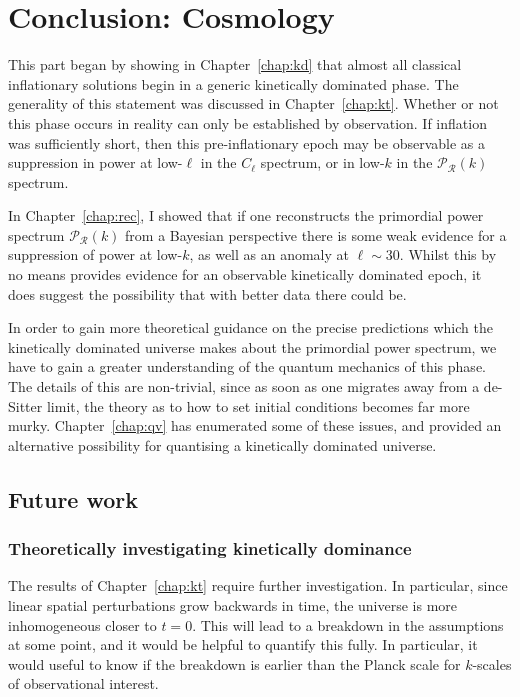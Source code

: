 \chapter*[Conclusion: Cosmology]{Conclusion: Cosmology}

This part began by showing in Chapter~\ref{chap:kd} that almost all classical inflationary solutions begin in a generic kinetically dominated phase. The generality of this statement was discussed in Chapter~\ref{chap:kt}. 
Whether or not this phase occurs in reality can only be established by observation. If inflation was sufficiently short, then this pre-inflationary epoch may be observable as a suppression in power at low-\(\ell\) in the \(C_\ell\) spectrum, or in low-\(k\) in the \(\mathcal{P}_\mathcal{R}(k)\) spectrum. 

In Chapter~\ref{chap:rec}, I showed that if one reconstructs the primordial power spectrum \(\mathcal{P}_\mathcal{R}(k)\) from a Bayesian perspective there is some weak evidence for a suppression of power at low-\(k\), as well as an anomaly at \(\ell\sim30\). Whilst this by no means provides evidence for an observable kinetically dominated epoch, it does suggest the possibility that with better data there could be.

In order to gain more theoretical guidance on the precise predictions which the kinetically dominated universe makes about the primordial power spectrum, we have to gain a greater understanding of the quantum mechanics of this phase. The details of this are non-trivial, since as soon as one migrates away from a de-Sitter limit, the theory as to how to set initial conditions becomes far more murky. Chapter~\ref{chap:qv} has enumerated some of these issues, and provided an alternative possibility for quantising a kinetically dominated universe.

\section*{Future work}
\subsection*{Theoretically investigating kinetically dominance}
The results of Chapter~\ref{chap:kt} require further investigation. In particular, since linear spatial perturbations grow backwards in time, the universe is more inhomogeneous closer to \(t=0\). This will lead to a breakdown in the assumptions at some point, and it would be helpful to quantify this fully. In particular, it would useful to know if the breakdown is earlier than the Planck scale for \(k\)-scales of observational interest.

